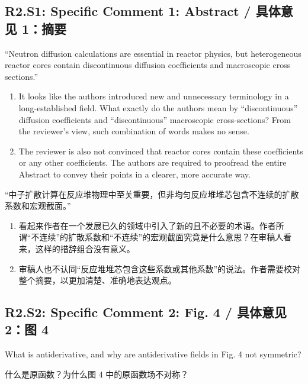 \documentclass[11pt,a4paper,twoside]{article}
\begin{document}
\subsection{R2.S1: Specific Comment 1: Abstract / 具体意见 1：摘要}
\begin{englishcomment}
``Neutron diffusion calculations are essential in reactor physics, but heterogeneous reactor cores contain discontinuous diffusion coefficients and macroscopic cross sections.''

\begin{enumerate}[label=\alph*.,leftmargin=2em]
\item It looks like the authors introduced new and unnecessary terminology in a long-established field. What exactly do the authors mean by ``discontinuous'' diffusion coefficients and ``discontinuous'' macroscopic cross-sections? From the reviewer's view, such combination of words makes no sense.
\item The reviewer is also not convinced that reactor cores contain these coefficients or any other coefficients. The authors are required to proofread the entire Abstract to convey their points in a clearer, more accurate way.
\end{enumerate}
\end{englishcomment}
\begin{chinesecomment}
“中子扩散计算在反应堆物理中至关重要，但非均匀反应堆堆芯包含不连续的扩散系数和宏观截面。”

\begin{enumerate}[label=\alph*.,leftmargin=2em]
\item 看起来作者在一个发展已久的领域中引入了新的且不必要的术语。作者所谓“不连续”的扩散系数和“不连续”的宏观截面究竟是什么意思？在审稿人看来，这样的措辞组合没有意义。
\item 审稿人也不认同“反应堆堆芯包含这些系数或其他系数”的说法。作者需要校对整个摘要，以更加清楚、准确地表达观点。
\end{enumerate}
\end{chinesecomment}
\begin{revisionidea}
\end{revisionidea}

\subsection{R2.S2: Specific Comment 2: Fig. 4 / 具体意见 2：图 4}
\begin{englishcomment}
What is antiderivative, and why are antiderivative fields in Fig. 4 not symmetric?
\end{englishcomment}
\begin{chinesecomment}
什么是原函数？为什么图 4 中的原函数场不对称？
\end{chinesecomment}
\begin{revisionidea}
\end{revisionidea}
\end{document}
